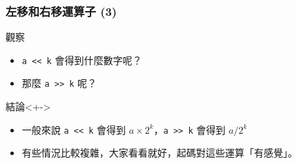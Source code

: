 \documentclass[utf8]{beamer}
\begin{document}
\begin{CJK}{UTF8}{bkai}
\begin{frame}[fragile]
  \frametitle{左移和右移運算子 (3)}
  \begin{block}{觀察}
    \begin{itemize}[<+->]
    \item \lstinline{a << k}{} 會得到什麼數字呢？
    \item 那麼 \lstinline{a >> k}{} 呢？
    \end{itemize}
  \end{block}
  \begin{alertblock}{結論}<+->
    \begin{itemize}
    \item 一般來說 \lstinline{a << k}{} 會得到 $a\times{2^k}$，\lstinline{a >> k}{} 會得到 $a / 2^k$
    \item<+-> 有些情況比較複雜，大家看看就好，起碼對這些運算「有感覺」。
    \end{itemize}
  \end{alertblock}
\end{frame}


\end{CJK}
\end{document}
